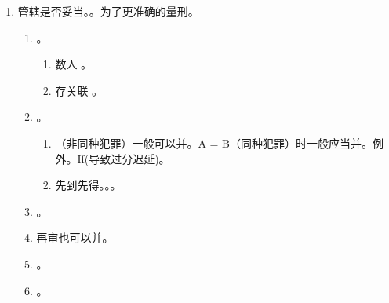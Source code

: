 \begin{enumerate}
  \item {}管辖是否妥当。。为了更准确的量刑。
        \begin{enumerate}
          \item {}。
                \begin{enumerate}
                  \item 数人 \yjt {}。
                  \item 存关联 \yjt {}。
                \end{enumerate}
          \item {}。
                \begin{enumerate}
                  \item （非同种犯罪）一般可以并。A = B（同种犯罪）时一般应当并。例外。If(导致过分迟延)。
                  \item 先到先得。。。
                \end{enumerate}
          \item {}。
          \item 再审也可以并。
          \item {}。
          \item {}。
        \end{enumerate}
\end{enumerate}
